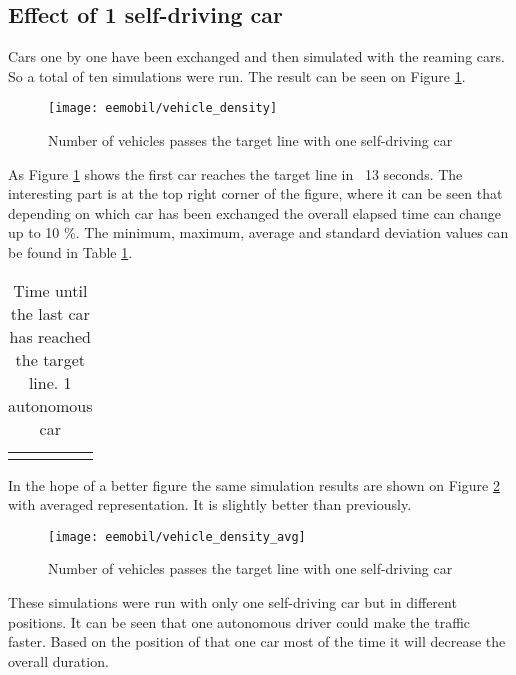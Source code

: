		\subsection{Effect of 1 self-driving car}
		Cars one by one have been exchanged and then simulated with the reaming cars. So a total of ten simulations were run. The result can be seen on Figure \ref{fig:vehicle_density}.
		\begin{figure}
			\centering
			\texttt{[image: eemobil/vehicle\_density]}
			\caption{Number of vehicles passes the target line with one self-driving car}
			\label{fig:vehicle_density}
		\end{figure}

		As Figure \ref{fig:vehicle_density} shows the first car reaches the target line in ~13 seconds. The interesting part is at the top right corner of the figure, where it can be seen that depending on which car has been exchanged the overall elapsed time can change up to 10 \%. The minimum, maximum, average and standard deviation values can be found in Table \ref{tab:vehicle_density_minmaxavg_case1}.
		\begin{table}
			\begin{center}
				\begin{tabular}{ |c|c|c|c|}
					\hline
					\vehicledensitytable{1}
					\hline
				\end{tabular}
			\end{center}
			\caption{Time until the last car has reached the target line. 1 autonomous car}
			\label{tab:vehicle_density_minmaxavg_case1}
		\end{table}
		
		In the hope of a better figure the same simulation results are shown on Figure \ref{fig:vehicle_density_avg} with averaged representation. It is slightly better than previously.
		
		\begin{figure}
			\centering
			\texttt{[image: eemobil/vehicle\_density\_avg]}
			\caption{Number of vehicles passes the target line with one self-driving car}
			\label{fig:vehicle_density_avg}
		\end{figure}
		
		These simulations were run with only one self-driving car but in different positions. It can be seen that one autonomous driver could make the traffic faster. Based on the position of that one car most of the time it will decrease the overall duration.

